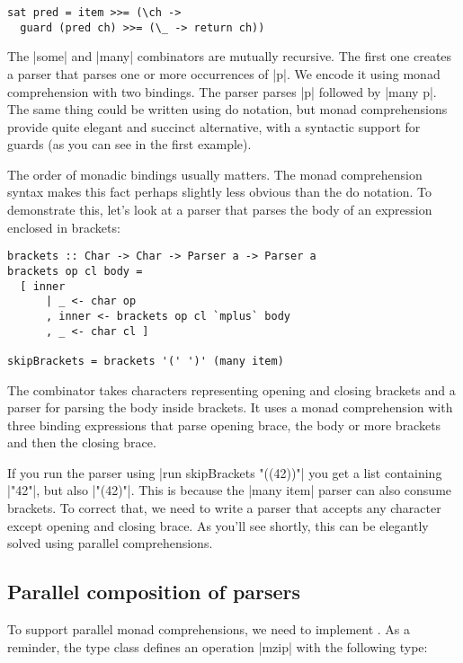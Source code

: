 \documentclass{tmr}
\begin{document}
\begin{verbatim}
sat pred = item >>= (\ch ->
  guard (pred ch) >>= (\_ -> return ch))
\end{verbatim}

The |some| and |many| combinators are mutually recursive. The first one creates a parser that 
parses one or more occurrences of |p|. We encode it using monad comprehension with two bindings. 
The parser parses |p| followed by |many p|. The same thing could be written using do notation, but 
monad comprehensions provide quite elegant and succinct alternative, with a syntactic support for 
guards (as you can see in the first example).

The order of monadic bindings usually matters. The monad comprehension syntax makes this fact
perhaps slightly less obvious than the do notation. To demonstrate this, let's look at a parser that
parses the body of an expression enclosed in brackets:

\begin{verbatim}
brackets :: Char -> Char -> Parser a -> Parser a
brackets op cl body = 
  [ inner 
      | _ <- char op
      , inner <- brackets op cl `mplus` body
      , _ <- char cl ]

skipBrackets = brackets '(' ')' (many item)
\end{verbatim}
The combinator takes characters representing opening and closing brackets and a parser for parsing 
the body inside brackets. It uses a monad comprehension with three binding expressions that parse
opening brace, the body or more brackets and then the closing brace.

If you run the parser using |run skipBrackets "((42))"| you get a list containing |"42"|, but also 
|"(42)"|. This is because the |many item| parser can also consume brackets. To correct that, we need
to write a parser that accepts any character except opening and closing brace. As you'll see 
shortly, this can be elegantly solved using parallel comprehensions.


\subsection{Parallel composition of parsers}
To support parallel monad comprehensions, we need to implement . 
As a reminder, the type class defines an operation |mzip| with the following type:
\end{document}
